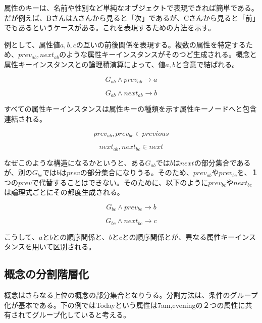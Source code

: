 \documentclass[12pt]{article}
\begin{document}
属性のキーは、名前や性別など単純なオブジェクトで表現できれば簡単である。だが例えば、BさんはAさんから見ると「次」であるが、Cさんから見ると「前」でもあるというケースがある。これを表現するための方法を示す。

例として、属性値\(a,b,c\)の互いの前後関係を表現する。複数の属性を特定するため、\(prev_{ab},next_{ab}\)のような属性キーインスタンスがそのつど生成される。概念と属性キーインスタンスとの論理積演算によって、値\(a,b\)と含意で結ばれる。

\begin{equation} G_{ab} \wedge prev_{ab} \rightarrow a\end{equation}

\begin{equation} G_{ab} \wedge next_{ab} \rightarrow b\end{equation}

すべての属性キーインスタンスは属性キーの種類を示す属性キーノードへと包含連結される。

\begin{equation} prev_{ab},prev_{bc} \in previous\end{equation}

\begin{equation} next_{ab},next_{bc} \in next\end{equation}

なぜこのような構造になるかというと、ある\(G_{ab}\)では\(b\)は\(next\)の部分集合であるが、別の\(G_{bc}\)では\(b\)は\(prev\)の部分集合になりうる。そのため、\(prev_{ab}\)や\(prev_{bc}\)を、１つの\(prev\)で代替することはできない。そのために、以下のように\(prev_{bc}\)や\(next_{bc}\)は論理式ごとにその都度生成される。

\begin{equation} G_{bc} \wedge prev_{bc} \rightarrow b\end{equation}

\begin{equation} G_{bc} \wedge next_{bc} \rightarrow c\end{equation}

こうして、\(a\)と\(b\)との順序関係と、\(b\)と\(c\)との順序関係とが、異なる属性キーインスタンスを用いて区別される。

\subsection{概念の分割階層化}\label{ux6982ux5ff5ux306eux5206ux5272ux968eux5c64ux5316}

概念はさらなる上位の概念の部分集合となりうる。分割方法は、条件のグループ化が基本である。下の例ではTodayという属性は7am,eveningの２つの属性に共有されてグループ化していると考える。
\end{document}
